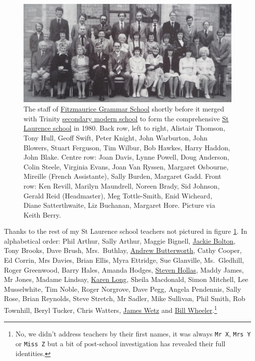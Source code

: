 \documentclass[
]{book}
\begin{document}
\begin{figure}

{\centering \includegraphics[width=1\linewidth]{images/fitzmaurice-grammar-school} 

}

\caption{The staff of \href{https://en.wikipedia.org/wiki/Fitzmaurice_Grammar_School}{Fitzmaurice Grammar School} shortly before it merged with Trinity \href{https://en.wikipedia.org/wiki/Secondary_modern_school}{secondary modern school} to form the comprehensive \href{https://en.wikipedia.org/wiki/St_Laurence_School}{St Laurence school} in 1980. Back row, left to right, Alistair Thomson, Tony Hull, Geoff Swift, Peter Knight, John Warburton, John Blowers, Stuart Ferguson, Tim Wilbur, Bob Hawkes, Harry Haddon, John Blake. Centre row: Joan Davis, Lynne Powell, Doug Anderson, Colin Steele, Virginia Evans, Joan Van Ryssen, Margaret Osbourne, Mireille (French Assistante), Sally Burden, Margaret Gadd. Front row: Ken Revill, Marilyn Maundrell, Noreen Brady, Sid Johnson, Gerald Reid (Headmaster), Meg Tottle-Smith, Enid Wicheard, Diane Satterthwaite, Liz Buchanan, Margaret Hore. Picture via Keith Berry. \citep{bradfordonavon}}\label{fig:fitzmaurice-fig}
\end{figure}



Thanks to the rest of my St Laurence school teachers not pictured in figure \ref{fig:fitzmaurice-fig}. In alphabetical order: Phil Arthur, Sally Arthur, Maggie Bignell, \href{https://www.wiltshiretimes.co.uk/news/11774162.the-life-of-mrs-jackie-bolton/}{Jackie Bolton}, Tony Brooks, Dave Brush, Mrs.~Buthlay, \href{https://www.youtube.com/watch?v=Hg9irmFwFr8}{Andrew Butterworth}, Cathy Cooper, Ed Corrin, Mrs Davies, Brian Ellis, Myra Ettridge, Sue Glanville, Ms.~Gledhill, Roger Greenwood, Barry Hales, Amanda Hodges, \href{https://www.bathminervachoir.co.uk/our-accompanist}{Steven Hollas}, Maddy James, Mr Jones, Madame Lindsay, \href{https://www.amazon.co.uk/Karen-Long/e/B00NMARBTS}{Karen Long}, Sheila Macdonald, Simon Mitchell, Lee Musselwhite, Tim Noble, Roger Norgrove, Dave Pegg, Angela Pendennis, Sally Rose, Brian Reynolds, Steve Stretch, Mr Sadler, Mike Sullivan, Phil Smith, Rob Townhill, Beryl Tucker, Chris Watters, \href{https://www.sourcewatch.org/index.php/James_Wetz}{James Wetz} and \href{https://www.gazetteandherald.co.uk/news/7412797.school-marks-25th-with-street-party/}{Bill Wheeler}.\footnote{No, we didn't address teachers by their first names, it was always \texttt{Mr\ X}, \texttt{Mrs\ Y} or \texttt{Miss\ Z} but a bit of post-school investigation has revealed their full identities.}
\end{document}
